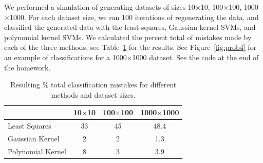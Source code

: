 \documentclass{article}
\begin{document}
\begin{homeworkProblem}

    We performed a simulation of generating datasets of sizes 10$\times$10,
    100$\times$100, 1000$\times$1000. For each dataset size, we ran 100
    iterations of regenerating the data, and classified the generated data with
    the least squares, Gaussian kernel SVMs, and polynomial kernel SVMs. We
    calculated the percent total of mistakes made by each of the three methods,
    see Table~\ref{table:prob4} for the results. See Figure~\ref{fig:prob4} for
    an example of classifications for a 1000$\times$1000 dataset. See the code
    at the end of the homework.

    \begin{table}[!ht]

        \caption{\label{table:prob4} Resulting \% total classification mistakes
        for different methods and dataset sizes.}

        \begin{center}
            \begin{tabular}{lccc}
                
                & 10$\times$10 & 100$\times$100 & 1000$\times$1000 \\
                \hline \hline
                Least Squares     & 33 & 45 & 48.4 \\
                Gaussian Kernel   & 2  & 2 & 1.3 \\
                Polynomial Kernel & 8  & 3 & 3.9 \\

            \end{tabular}
        \end{center}
    \end{table}
    \begin{figure}[!ht]
        
        \begin{centering}
        

\end{centering}
\end{figure}
\end{homeworkProblem}
\end{document}

